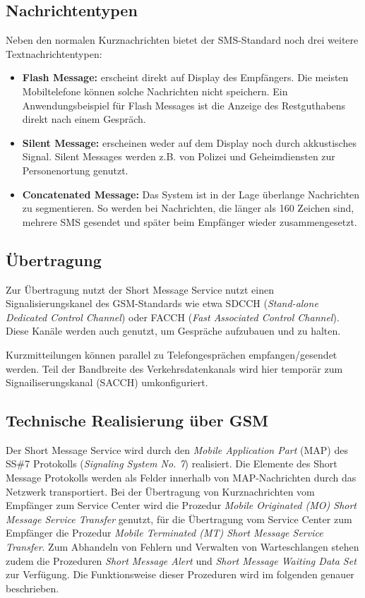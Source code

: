 \documentclass[german,12pt,a4paper]{article}
\begin{document}
\subsection{Nachrichtentypen}
Neben den normalen Kurznachrichten bietet der SMS-Standard noch drei weitere Textnachrichtentypen:
\begin{itemize}
	\item \textbf{Flash Message:} erscheint direkt auf Display des Empfängers. Die meisten Mobiltelefone 
        können solche Nachrichten nicht speichern. Ein Anwendungsbeispiel für Flash Messages ist die 
        Anzeige des Restguthabens direkt nach einem Gespräch.
	\item \textbf{Silent Message:} erscheinen weder auf dem Display noch durch akkustisches Signal. 
		Silent Messages werden z.B. von Polizei und Geheimdiensten zur Personenortung genutzt.
	\item \textbf{Concatenated Message:} Das System ist in der Lage überlange 
Nachrichten zu segmentieren. So werden bei Nachrichten, die länger als 160 Zeichen 
sind, mehrere SMS gesendet und später beim Empfänger wieder zusammengesetzt.
\end{itemize}

\subsection{Übertragung}
Zur Übertragung nutzt der Short Message Service nutzt einen Signalisierungskanel des GSM-Standards wie etwa SDCCH 
(\textit{Stand-alone Dedicated Control Channel}) oder FACCH (\textit{Fast Associated Control Channel}). 
Diese Kanäle werden auch genutzt, um Gespräche aufzubauen und zu halten.

Kurzmitteilungen können parallel zu Telefongesprächen empfangen/gesendet werden. Teil der Bandbreite des 
Verkehrsdatenkanals wird hier temporär zum Signailiserungskanal (SACCH) umkonfiguriert\cite{wikipedia:sms}.


\subsection{Technische Realisierung über GSM}
Der Short Message Service wird durch den \textit{Mobile Application Part} (MAP) des SS\#7 Protokolls (\textit{Signaling 
System No. 7}) realisiert\cite{3gpp:map}. Die Elemente des Short Message Protokolls werden als Felder innerhalb von 
MAP-Nachrichten durch das Netzwerk transportiert. Bei der Übertragung von Kurznachrichten vom Empfänger zum
Service Center wird die Prozedur \textit{Mobile Originated (MO) Short Message Service Transfer} genutzt,
für die Übertragung vom Service Center zum Empfänger die Prozedur \textit{Mobile Terminated (MT) Short
Message Service Transfer}. Zum Abhandeln von Fehlern und Verwalten von Warteschlangen stehen zudem die 
Prozeduren \textit{Short Message Alert} und \textit{Short Message Waiting Data Set} 
zur Verfügung\cite{3gpp:map}. Die Funktionsweise dieser Prozeduren wird im folgenden genauer beschrieben.
\end{document}

